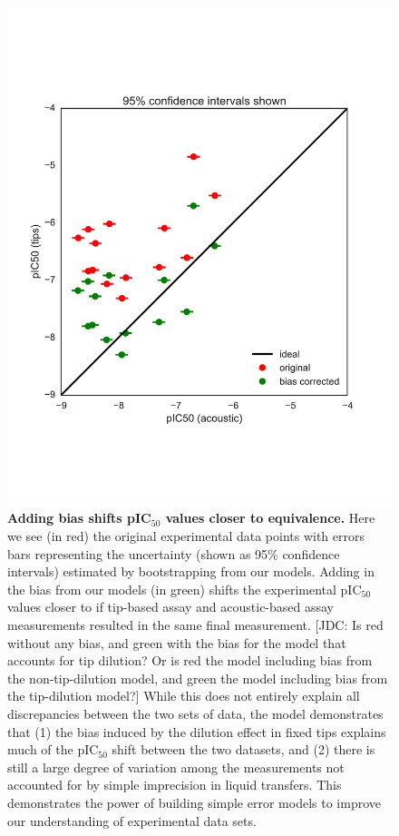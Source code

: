 \documentclass[aps,pre,twocolumn,nofootinbib,superscriptaddress,linenumbers]{revtex4-1}
\begin{document}
\begin{figure}[tb]
    \includegraphics[width=\columnwidth]{../figures/compare-pIC50-bias_corrected.pdf}

  \caption{{\bf Adding bias shifts pIC$_{50}$ values closer to equivalence.}
  Here we see (in red) the original experimental data points with errors bars representing the uncertainty (shown as 95\% confidence intervals) estimated by bootstrapping from our models. 
  Adding in the bias from our models (in green) shifts the experimental pIC$_{50}$ values closer to if tip-based assay and acoustic-based assay measurements resulted in the same final measurement. 
  {\color{red}[JDC: Is red without any bias, and green with the bias for the model that accounts for tip dilution?  Or is red the model including bias from the non-tip-dilution model, and green the model including bias from the tip-dilution model?]}
  While this does not entirely explain all discrepancies between the two sets of data, the model demonstrates that (1) the bias induced by the dilution effect in fixed tips explains much of the pIC$_{50}$ shift between the two datasets, and (2) there is still a large degree of variation among the measurements not accounted for by simple imprecision in liquid transfers.
  This demonstrates the power of building simple error models to improve our understanding of experimental data sets.
  }
  \label{fig:IC50_bias}
\end{figure}
\end{document}
